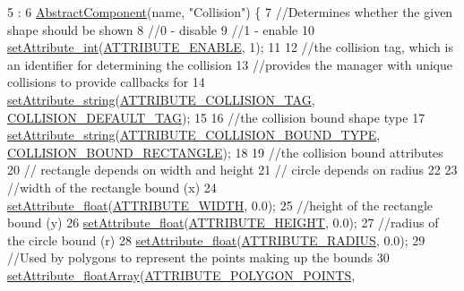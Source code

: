 \begin{DoxyCode}
5                                                      :
6     \hyperlink{class_abstract_component_ab08b845eddbdbe411b95a5385501ab97}{AbstractComponent}(name, \textcolor{stringliteral}{"Collision"}) \{
7     \textcolor{comment}{//Determines whether the given shape should be shown}
8         \textcolor{comment}{//0 - disable}
9         \textcolor{comment}{//1 - enable}
10     \hyperlink{class_abstract_component_aca84c14d196467bda6aff90521b1ae7f}{setAttribute\_int}(\hyperlink{_a_e___attributes_8h_a4c775095baf8a9c99621ad9ad3b622db}{ATTRIBUTE\_ENABLE}, 1);
11 
12     \textcolor{comment}{//the collision tag, which is an identifier for determining the collision}
13      \textcolor{comment}{//provides the manager with unique collisions to provide callbacks for}
14     \hyperlink{class_abstract_component_a702ec2cc2624561ef51afcd9c8061fd2}{setAttribute\_string}(\hyperlink{_a_e___attributes_8h_a26b14cbbf2e63e42061d132e25412f59}{ATTRIBUTE\_COLLISION\_TAG}, 
      \hyperlink{_a_e___attributes_8h_ad6932d214295ee70eecab27c5eb3e51a}{COLLISION\_DEFAULT\_TAG});
15 
16     \textcolor{comment}{//the collision bound shape type}
17     \hyperlink{class_abstract_component_a702ec2cc2624561ef51afcd9c8061fd2}{setAttribute\_string}(\hyperlink{_a_e___attributes_8h_a22ab960bb5b8b4b1350c7a25cadc49a5}{ATTRIBUTE\_COLLISION\_BOUND\_TYPE}, 
      \hyperlink{_a_e___attributes_8h_a3a31a6297a55375fdc090f881de08327}{COLLISION\_BOUND\_RECTANGLE});
18 
19     \textcolor{comment}{//the collision bound attributes}
20     \textcolor{comment}{//  rectangle depends on width and height}
21     \textcolor{comment}{//  circle depends on radius}
22 
23     \textcolor{comment}{//width of the rectangle bound (x)}
24     \hyperlink{class_abstract_component_aadaf9dfbb371db5fb21f9c7cf2cbea98}{setAttribute\_float}(\hyperlink{_a_e___attributes_8h_aade9a992cd068c12793a1bb56d015022}{ATTRIBUTE\_WIDTH}, 0.0);
25     \textcolor{comment}{//height of the rectangle bound (y)}
26     \hyperlink{class_abstract_component_aadaf9dfbb371db5fb21f9c7cf2cbea98}{setAttribute\_float}(\hyperlink{_a_e___attributes_8h_ad1f046fde393a66e7c49f97b08af1c0d}{ATTRIBUTE\_HEIGHT}, 0.0);
27     \textcolor{comment}{//radius of the circle bound (r)}
28     \hyperlink{class_abstract_component_aadaf9dfbb371db5fb21f9c7cf2cbea98}{setAttribute\_float}(\hyperlink{_a_e___attributes_8h_a5b0feddcf4ea3df07d1a9a2f9dd3bf70}{ATTRIBUTE\_RADIUS}, 0.0);
29     \textcolor{comment}{//Used by polygons to represent the points making up the bounds}
30     \hyperlink{class_abstract_component_a8829d475d858bc03e3e3be0e18f18fdb}{setAttribute\_floatArray}(\hyperlink{_a_e___attributes_8h_a26ee781739ac518473cf414ecc968239}{ATTRIBUTE\_POLYGON\_POINTS}, 

\end{DoxyCode}
